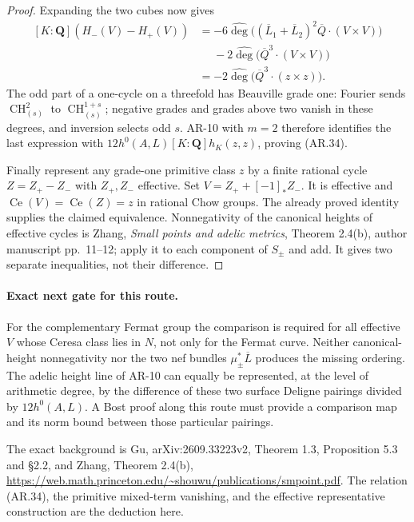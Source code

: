 \begin{proof}
Expanding the two cubes now gives
\[
 \begin{split}
 [K:\mathbf Q](H_-(V)-H_+(V))
 &=-6\widehat{\deg}\bigl((\overline L_1+\overline L_2)^2
                           \overline Q\cdot(V\times V)\bigr)\\
 &\phantom{={}}-2\widehat{\deg}\bigl(\overline Q^3
                           \cdot(V\times V)\bigr)\\
 &=-2\widehat{\deg}\bigl(\overline Q^3\cdot(z\times z)\bigr).
 \end{split}
\]
The odd part of a one-cycle on a threefold has Beauville grade one:
Fourier sends $\operatorname{CH}^2_{(s)}$ to
$\operatorname{CH}^{1+s}_{(s)}$; negative grades and grades above two
vanish in these degrees, and inversion selects odd $s$.
AR-10 with $m=2$ therefore identifies the last expression with
$12h^0(A,L)[K:\mathbf Q]h_K(z,z)$, proving (AR.34).

Finally represent any grade-one primitive class $z$ by a finite rational
cycle $Z=Z_+-Z_-$ with $Z_+,Z_-$ effective. Set
$V=Z_++[-1]_*Z_-$. It is effective and
$\operatorname{Ce}(V)=\operatorname{Ce}(Z)=z$ in rational Chow groups.
The already proved identity supplies the claimed equivalence.
Nonnegativity of the canonical heights of effective cycles is Zhang,
\emph{Small points and adelic metrics}, Theorem 2.4(b), author manuscript
pp.~11--12; apply it to each component of $S_\pm$ and add. It gives two
separate inequalities, not their difference.\end{proof}

\paragraph{Exact next gate for this route.}
For the complementary Fermat group the comparison is required for all
effective $V$ whose Ceresa class lies in $N$, not only for the Fermat
curve. Neither canonical-height nonnegativity nor the two nef bundles
$\mu_\pm^*\overline L$ produces the missing ordering. The adelic height
line of AR-10 can equally be represented, at the level of arithmetic
degree, by the difference of these two surface Deligne pairings divided
by $12h^0(A,L)$. A Bost proof along this route must provide a comparison
map and its norm bound between those particular pairings.

The exact background is Gu, arXiv:2609.33223v2, Theorem 1.3,
Proposition 5.3 and \S2.2, and Zhang, Theorem 2.4(b),
\url{https://web.math.princeton.edu/~shouwu/publications/smpoint.pdf}.
The relation (AR.34), the primitive mixed-term vanishing, and the
effective representative construction are the deduction here.
